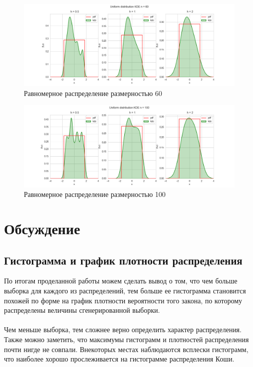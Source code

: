 \documentclass[a4paper,14pt]{article}
\begin{document}
	\begin{figure}[H]
		\centering
		\includegraphics[scale=0.48]{./lab1_4/pictures/Uniform distributionKDE60.png}
		\caption{Равномерное распределение размерностью 60}
	\end{figure}
	
	\begin{figure}[H]
		\centering
		\includegraphics[scale=0.48]{./lab1_4/pictures/Uniform distributionKDE100.png}
		\caption{Равномерное распределение размерностью 100}
	\end{figure}
	\newpage
	\section{Обсуждение}
	\subsection{Гистограмма и график плотности распределения}
	
	По итогам проделанной работы можем сделать вывод о том, что чем
больше выборка для каждого из распределений, тем больше ее гистограмма становится похожей по форме на график плотности вероятности того закона, по которому распределены
величины сгенерированной выборки. 
	~\\
	~\\
	Чем меньше выборка, тем сложнее верно определить характер распределения. Также можно заметить, что максимумы гистограмм и плотностей распределения почти нигде не совпали. Внекоторых местах наблюдаются всплески гистограмм, что наиболее хорошо прослеживается на гистограмме распределения Коши.
	
\end{document}

